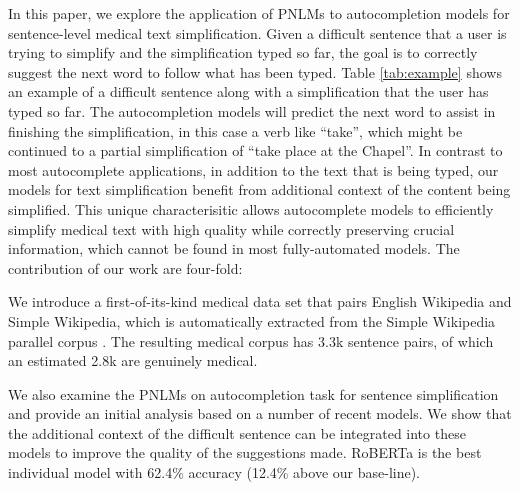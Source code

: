 \documentclass[11pt]{article}
\begin{document}
In this paper, we explore the application of PNLMs to autocompletion models for sentence-level medical text simplification. Given a difficult sentence that a user is trying to simplify and the simplification typed so far, the goal is to correctly suggest the next word to follow what has been typed. Table \ref{tab:example} shows an example of a difficult sentence along with a simplification that the user has typed so far. The autocompletion models will predict the next word to assist in finishing the simplification, in this case a verb like ``take'', which might be continued to a partial simplification of ``take place at the Chapel''. In contrast to most autocomplete applications, in addition to the text that is being typed, our models for text  simplification benefit from additional context of the content being simplified. This unique characterisitic allows autocomplete models to efficiently simplify medical text with high quality while correctly preserving crucial information, which cannot be found in most fully-automated models. The contribution of our work are four-fold:

\begin{table}
    \centering
    \caption{An example text simplification autocompletion task.  The user is simplifying the difficult sentence on top and has typed the words on the bottom so far.}
    \label{tab:example}
\end{table}

 We introduce a first-of-its-kind medical data set that pairs English Wikipedia and Simple Wikipedia, which is automatically extracted from the Simple Wikipedia parallel corpus \cite{kauchak2013improving}. The resulting medical corpus has 3.3k sentence pairs, of which an estimated 2.8k are genuinely medical.

 We also examine the PNLMs on autocompletion task for sentence simplification and provide an initial analysis based on a number of recent models. We show that the additional context of the difficult sentence can be integrated into these models to improve the quality of the suggestions made.  RoBERTa is the best individual model with 62.4\% accuracy (12.4\% above our base-line).
\end{document}
